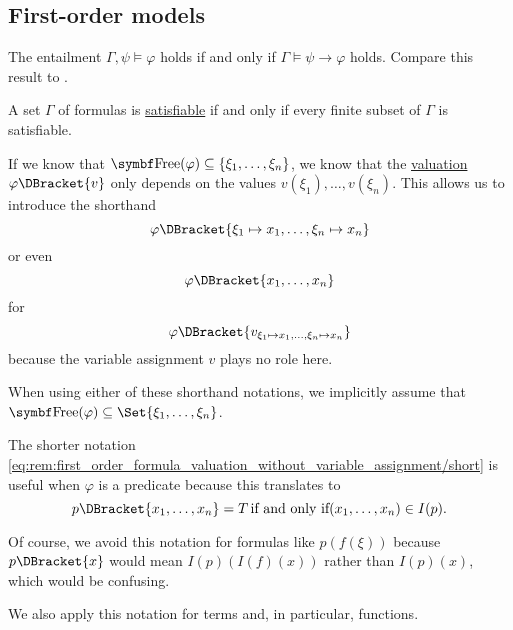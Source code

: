 \subsection{First-order models}\label{subsec:first_order_models}

\begin{theorem}\label{thm:semantic_deduction_theorem}
  The entailment \( \Gamma, \psi \vDash \varphi \) holds if and only if \( \Gamma \vDash \psi \to \varphi \) holds. Compare this result to .
\end{theorem}

\begin{theorem}\label{thm:first_order_compactness_theorem}
  A set \( \Gamma \) of formulas is \hyperref[def:propositional_semantics/satisfiability]{satisfiable} if and only if every finite subset of \( \Gamma \) is satisfiable.
\end{theorem}

\begin{remark}\label{rem:first_order_formula_valuation_without_variable_assignment}
  If we know that \( \Bold{Free}(\varphi) \subseteq \{ \xi_1, \ldots, \xi_n \} \), we know that the \hyperref[def:first_order_valuation/formula_valuation]{valuation} \( \varphi\DBracket{v} \) only depends on the values \( v(\xi_1), \ldots, v(\xi_n) \). This allows us to introduce the shorthand
  \begin{equation}\label{eq:rem:first_order_formula_valuation_without_variable_assignment/long}
    \varphi\DBracket{\xi_1 \mapsto x_1, \ldots, \xi_n \mapsto x_n}
  \end{equation}
  or even
  \begin{equation}\label{eq:rem:first_order_formula_valuation_without_variable_assignment/short}
    \varphi\DBracket{x_1, \ldots, x_n}
  \end{equation}
  for
  \begin{equation*}
    \varphi\DBracket{v_{\xi_1 \mapsto x_1, \ldots, \xi_n \mapsto x_n}}
  \end{equation*}
  because the variable assignment \( v \) plays no role here.

  When using either of these shorthand notations, we implicitly assume that \( \Bold{Free}(\varphi) \subseteq \Set{ \xi_1, \ldots, \xi_n } \).

  The shorter notation \eqref{eq:rem:first_order_formula_valuation_without_variable_assignment/short} is useful when \( \varphi \) is a predicate because this translates to
  \begin{equation*}
    p\DBracket{x_1, \ldots, x_n} = T \T{if and only if} (x_1, \ldots, x_n) \in I(p).
  \end{equation*}

  Of course, we avoid this notation for formulas like \( p(f(\xi)) \) because \( p\DBracket{x} \) would mean \( I(p)(I(f)(x)) \) rather than \( I(p)(x) \), which would be confusing.

  We also apply this notation for terms and, in particular, functions.
\end{remark}

